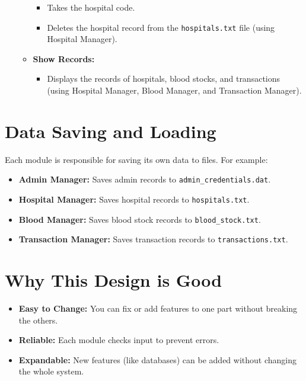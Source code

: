 \documentclass[12pt,a4paper]{report}
\begin{document}
\begin{itemize}
\begin{itemize}
\begin{itemize}
            \item Takes the hospital code.
            \item Deletes the hospital record from the \texttt{hospitals.txt} file (using Hospital Manager).
        \end{itemize}
        \item \normalsize \textbf{Show Records:}
        \begin{itemize}
            \item Displays the records of hospitals, blood stocks, and transactions (using Hospital Manager, Blood Manager, and Transaction Manager).
        \end{itemize}
    \end{itemize}
\end{itemize}

\section{Data Saving and Loading}
Each module is responsible for saving its own data to files. For example:
\begin{itemize}
    \item \normalsize \textbf{Admin Manager:} Saves admin records to \texttt{admin\_credentials.dat}.
    \item \normalsize \textbf{Hospital Manager:} Saves hospital records to \texttt{hospitals.txt}.
    \item \normalsize \textbf{Blood Manager:} Saves blood stock records to \texttt{blood\_stock.txt}.
    \item \normalsize \textbf{Transaction Manager:} Saves transaction records to \texttt{transactions.txt}.
\end{itemize}

\section{Why This Design is Good}
\begin{itemize}
    \item \normalsize \textbf{Easy to Change:} You can fix or add features to one part without breaking the others.
    \item \normalsize \textbf{Reliable:} Each module checks input to prevent errors.
    \item \normalsize \textbf{Expandable:} New features (like databases) can be added without changing the whole system.
\end{itemize}
\end{document}
